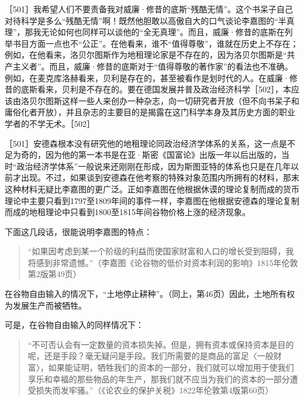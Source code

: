 ［501］我希望人们不要责备我对威廉·修昔的底斯“残酷无情”。这个书呆子自己对待科学是多么“残酷无情”啊！既然他胆敢以高傲自大的口气谈论李嘉图的“半真理”，那我无论如何也同样可以谈他的“全无真理”。而且，威廉·修昔的底斯在列举书目方面一点也不“公正”。在他看来，谁不“值得尊敬”，谁就在历史上不存在；例如，在他看来，洛贝尔图斯作为地租理论家是不存在的，因为洛贝尔图斯是“共产主义者”。而且，威廉·修昔的底斯对于“值得尊敬的著作家”的看法也不准确。例如，在麦克库洛赫看来，贝利是存在的，甚至被看作是划时代的人。在威廉·修昔的底斯看来，贝利是不存在的。要在德国发展并普及政治经济科学［502］，本应该由洛贝尔图斯这样一些人来创办一种杂志，向一切研究者开放（但不向书呆子和庸俗化者开放），并且杂志的主要目的是揭露在这门科学本身及其历史方面的职业学者的不学无术。［502］


［501］安德森根本没有研究他的地租理论同政治经济学体系的关系，这一点是不足为奇的，因为他的第一本书是在亚·斯密《国富论》出版一年以后出版的，当时“政治经济学体系”一般说来还刚刚在形成，因为斯图亚特的体系也只是在几年以前才出现。不过，如果谈到安德森在他考察的特殊对象范围内所拥有的材料，那末这种材料无疑比李嘉图的更广泛。正如李嘉图在他根据休谟的理论复制而成的货币理论中主要只看到1797至1809年间的事件一样，李嘉图在他根据安德森的理论复制而成的地租理论中只看到1800至1815年间谷物价格上涨的经济现象。


下面这几段话，很能说明李嘉图的特点：

\begin{quote}{“如果因考虑到某一个阶级的利益而使国家财富和人口的增长受到阻碍，我将感到非常遗憾。”（李嘉图《论谷物的低价对资本利润的影响》1815年伦敦第2版第49页）}\end{quote}

在谷物自由输入的情况下，“土地停止耕种”。（同上，第46页）因此，土地所有权为发展生产而被牺牲。

可是，在谷物自由输入的同样情况下：

\begin{quote}{“不可否认会有一定数量的资本损失掉。但是，拥有资本或保持资本是目的呢，还是手段？毫无疑问是手段。我们所需要的是商品的富足〈一般财富〉，如果能证明，牺牲我们的资本的一部分，我们就可以增加用于使我们享乐和幸福的那些物品的年生产，那我们就不应当为我们的资本的一部分遭受损失而发牢骚。”（《论农业的保护关税》1822年伦敦第4版第60页）}\end{quote}

